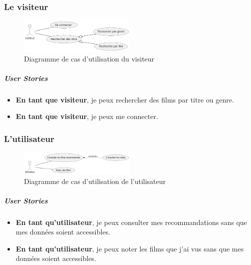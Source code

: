 \documentclass{article}
\begin{document}
\subsubsection{Le visiteur}
\begin{figure}[H]
    \centering
    \includegraphics[width=0.5\textwidth]{images/usecase/visiteur.png}
    \caption{Diagramme de cas d’utilisation du visiteur}
\end{figure}
\subparagraph{User Stories}
\begin{itemize}
    \item \textbf{En tant que visiteur}, je peux rechercher des films par titre ou genre.
    \item \textbf{En tant que visiteur}, je peux me connecter.
\end{itemize}
\subsubsection{L'utilisateur}
\begin{figure}[H]
    \centering
    \includegraphics[width=0.5\textwidth]{images/usecase/user.png}
    \caption{Diagramme de cas d’utilisation de l'utilisateur}
\end{figure}
\subparagraph{User Stories}
\begin{itemize}
    \item \textbf{En tant qu'utilisateur}, je peux consulter mes recommandations sans que mes données soient accessibles.
    \item \textbf{En tant qu'utilisateur}, je peux noter les films que j'ai vus sans que mes données soient accessibles.
\end{itemize}
\end{document}
